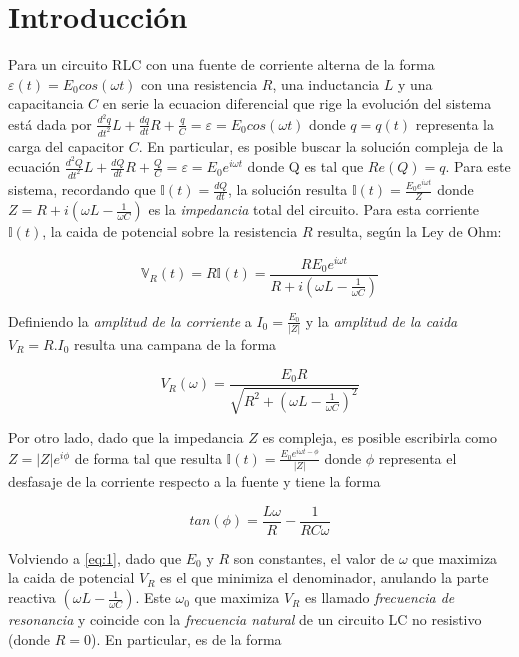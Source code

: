 \documentclass[11pt,a4paper]{article}
\begin{document}
\section{Introducción}\label{sec:intro}

Para un circuito RLC con una fuente de corriente alterna de la forma $\varepsilon(t) = E_{0}cos(\omega t)$ con una resistencia $R$, una inductancia $L$ y una capacitancia $C$ en serie la ecuacion diferencial que rige la evolución del sistema está dada por $\frac{d^2q}{dt^2}L+\frac{dq}{dt}R+\frac{q}{C} = \varepsilon = E_{0}cos(\omega t)$ donde $q = q(t)$ representa la carga del capacitor $C$. En particular, es posible buscar la solución compleja de la ecuación $\frac{d^2Q}{dt^2}L+\frac{dQ}{dt}R+\frac{Q}{C} = \varepsilon = E_{0}e^{i\omega t}$ donde Q es tal que $Re(Q) = q$. Para este sistema, recordando que $\mathbb{I}(t) = \frac{dQ}{dt}$, la solución resulta $\mathbb{I}(t) = \frac{E_0e^{i\omega t}}{Z}$ donde $Z = R +i(\omega L-\frac{1}{\omega C})$ es la \textit{impedancia} total del circuito. Para esta corriente $\mathbb{I}(t)$, la caida de potencial sobre la resistencia $R$ resulta, según la Ley de Ohm: 

\begin{equation}
\mathbb{V}_R(t) = R\mathbb{I}(t) = \frac{RE_0e^{i\omega t}}{R +i(\omega L-\frac{1}{\omega C})}
\label{eq:ohm}
\end{equation}

Definiendo la \textit{amplitud de la corriente} a $I_0 = \frac{E_0}{|Z|}$ y la \textit{amplitud de la caida} $V_R = R.I_0$ resulta una campana de la forma

\begin{equation}
V_R(\omega) = \frac{E_{0}R}{\sqrt{R^2 + (\omega L - \frac{1}{\omega C})^2}}
\label{eq:1}
\end{equation}

Por otro lado, dado que la impedancia $Z$ es compleja, es posible escribirla como $Z = |Z|e^{i\phi}$ de forma tal que resulta $\mathbb{I}(t) = \frac{E_0e^{i\omega t-\phi}}{|Z|}$ donde $\phi$ representa el desfasaje de la corriente respecto a la fuente y tiene la forma

\begin{equation}
tan(\phi) = \frac{L\omega}{R} - \frac{1}{RC\omega} 
\label{eq:2}
\end{equation}

Volviendo a \eqref{eq:1}, dado que $E_0$ y $R$ son constantes, el valor de $\omega$ que maximiza la caida de potencial $V_R$ es el que minimiza el denominador, anulando la parte reactiva $(\omega L - \frac{1}{\omega C})$. Este $\omega_0$ que maximiza $V_R$ es llamado \textit{frecuencia de resonancia} y coincide con la \textit{frecuencia natural} de un circuito LC no resistivo (donde $R=0$). En particular, es de la forma 
\end{document}
